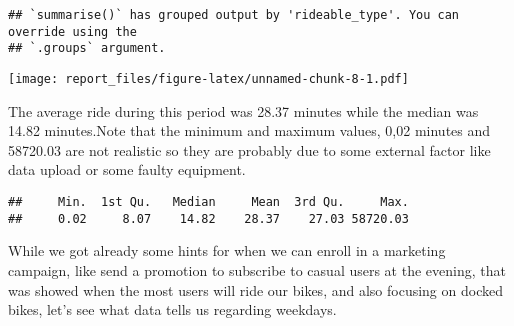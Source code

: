 \documentclass[
]{article}
\newenvironment{Shaded}{\begin{snugshade}}{\end{snugshade}}
\newcommand{\CommentTok}[1]{\textcolor[rgb]{0.56,0.35,0.01}{\textit{#1}}}
\newcommand{\FunctionTok}[1]{\textcolor[rgb]{0.13,0.29,0.53}{\textbf{#1}}}
\newcommand{\NormalTok}[1]{#1}
\newcommand{\SpecialCharTok}[1]{\textcolor[rgb]{0.81,0.36,0.00}{\textbf{#1}}}
\begin{document}
\begin{verbatim}
## `summarise()` has grouped output by 'rideable_type'. You can override using the
## `.groups` argument.
\end{verbatim}

\texttt{[image: report\_files/figure-latex/unnamed-chunk-8-1.pdf]}

The average ride during this period was 28.37 minutes while the median
was 14.82 minutes.Note that the minimum and maximum values, 0,02 minutes
and 58720.03 are not realistic so they are probably due to some external
factor like data upload or some faulty equipment.

\begin{Shaded}
\end{Shaded}

\begin{verbatim}
##     Min.  1st Qu.   Median     Mean  3rd Qu.     Max. 
##     0.02     8.07    14.82    28.37    27.03 58720.03
\end{verbatim}

While we got already some hints for when we can enroll in a marketing
campaign, like send a promotion to subscribe to casual users at the
evening, that was showed when the most users will ride our bikes, and
also focusing on docked bikes, let's see what data tells us regarding
weekdays.
\end{document}
